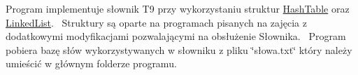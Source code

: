 Program implementuje słownik T9 przy wykorzystaniu struktur \mbox{\hyperlink{class_hash_table}{Hash\+Table}} oraz \mbox{\hyperlink{class_linked_list}{Linked\+List}}.~\newline
Struktury są oparte na programach pisanych na zajęcia z dodatkowymi modyfikacjami pozwalającymi na obsłużenie Słownika.~\newline
 Program pobiera bazę słów wykorzystywanych w słowniku z pliku \char`\"{}słowa.\+txt\char`\"{} który należy umieścić w głównym folderze programu.~\newline
